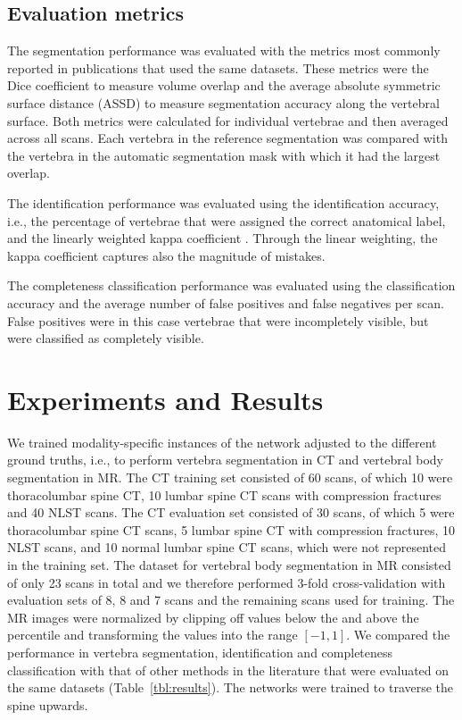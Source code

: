 \documentclass[authoryear,5p,final,times]{elsarticle}
\begin{document}
    \subsection{Evaluation metrics}
    
    The segmentation performance was evaluated with the metrics most commonly reported in publications that used the same datasets. These metrics were the Dice coefficient to measure volume overlap and the average absolute symmetric surface distance (ASSD) to measure segmentation accuracy along the vertebral surface. Both metrics were calculated for individual vertebrae and then averaged across all scans. Each vertebra in the reference segmentation was compared with the vertebra in the automatic segmentation mask with which it had the largest overlap.
    
    The identification performance was evaluated using the identification accuracy, i.e., the percentage of vertebrae that were assigned the correct anatomical label, and the linearly weighted kappa coefficient \citep{Cohen1968}. Through the linear weighting, the kappa coefficient captures also the magnitude of mistakes.
    
    The completeness classification performance was evaluated using the classification accuracy and the average number of false positives and false negatives per scan. False positives were in this case vertebrae that were incompletely visible, but were classified as completely visible.
    
    \section{Experiments and Results}
        
    We trained modality-specific instances of the network adjusted to the different ground truths, i.e., to perform vertebra segmentation in CT and vertebral body segmentation in MR. The CT training set consisted of 60 scans, of which 10 were thoracolumbar spine CT, 10 lumbar spine CT scans with compression fractures and 40 NLST scans. The CT evaluation set consisted of 30 scans, of which 5 were thoracolumbar spine CT scans, 5 lumbar spine CT with compression fractures, 10 NLST scans, and 10 normal lumbar spine CT scans, which were not represented in the training set. The dataset for vertebral body segmentation in MR consisted of only 23 scans in total and we therefore performed 3-fold cross-validation with evaluation sets of 8, 8 and 7 scans and the remaining scans used for training. The MR images were normalized by clipping off values below the  and above the  percentile and transforming the values into the range $[-1,1]$. We compared the performance in vertebra segmentation, identification and completeness classification with that of other methods in the literature that were evaluated on the same datasets (Table~\ref*{tbl:results}). The networks were trained to traverse the spine upwards.
    
\end{document}
